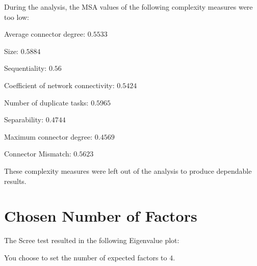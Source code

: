 \documentclass[a4paper]{article}
\begin{document}
\noindent
During the analysis, the MSA values of the following complexity measures were too low:
\begin{compactitem}
\item Average connector degree: $0.5533$
\item Size: $0.5884$
\item Sequentiality: $0.56$
\item Coefficient of network connectivity: $0.5424$
\item Number of duplicate tasks: $0.5965$
\item Separability: $0.4744$
\item Maximum connector degree: $0.4569$
\item Connector Mismatch: $0.5623$
\end{compactitem}
These complexity measures were left out of the analysis to produce dependable results.

\section*{Chosen Number of Factors}
The Scree test resulted in the following Eigenvalue plot:
\begin{center}
\end{center}
You choose to set the number of expected factors to $4$.
\end{document}
